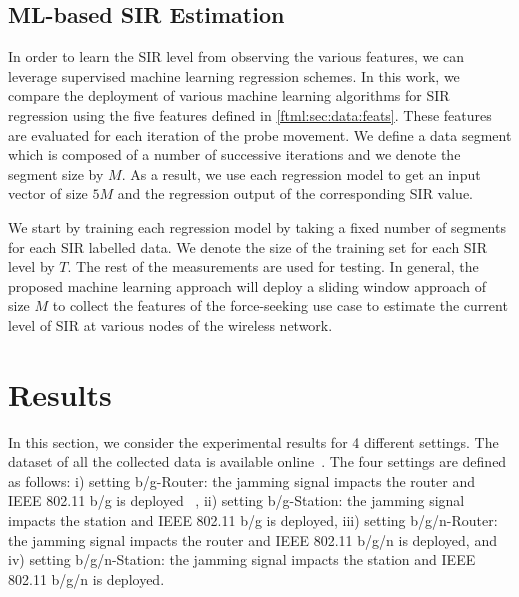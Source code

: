 	\subsection{ML-based SIR Estimation}\label{ftml:sec:data:ML}
   In order to learn the SIR level from observing the various features, we can leverage supervised machine learning regression schemes. 
   In this work, we compare the deployment of various machine learning algorithms for SIR regression using the five features defined in \ref{ftml:sec:data:feats}. These features are evaluated for each iteration of the probe movement. We define a data segment which is composed of a number of successive iterations and we denote the segment size by $M$. As a result, we use each regression model to get an input vector of size $5M$ and the regression output of the corresponding SIR value. 
   
   We start by training each regression model by taking a fixed number of segments for each SIR labelled data. We denote the size of the training set for each SIR level by $T$. The rest of the measurements are used for testing. In general, the proposed machine learning approach will deploy a sliding window approach of size $M$ to collect the features of the force-seeking use case to estimate the current level of SIR at various nodes of the wireless network. 
	
	\section{Results} \label{ftml:sec:results}  
	In this section, we consider the experimental results for 4 different settings. The dataset of all the collected data is available online~\cite{https://doi.org/10.18434/m32077}. The four settings are defined as follows: i) setting b/g-Router: the jamming signal impacts the router and IEEE 802.11 b/g is deployed ~\cite{IEEE802.11ac}, ii) setting b/g-Station: the jamming signal impacts the station and IEEE 802.11 b/g is deployed, iii) setting b/g/n-Router: the jamming signal impacts the router and IEEE 802.11 b/g/n is deployed, and iv) setting b/g/n-Station: the jamming signal impacts the station and IEEE 802.11 b/g/n is deployed.  
	
